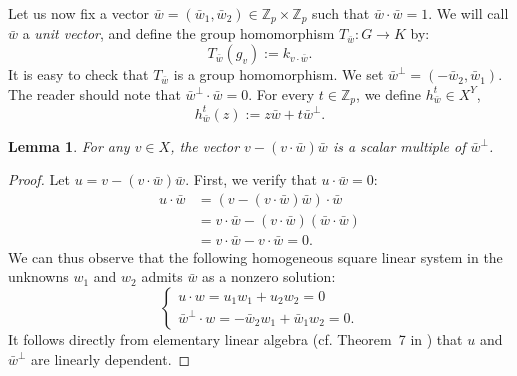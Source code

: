 \documentclass[11pt]{article}
\newtheorem{lemma}[theorem]{Lemma}
\newtheorem{proposition}[theorem]{Proposition}
\begin{document}
Let us now fix a vector $\bar{w} = (\bar{w}_1, \bar{w}_2) \in \mathbb{Z}_p \times \mathbb{Z}_p$ such that $\bar{w} \cdot \bar{w} = 1$. We will call $\bar w$ a \textit{unit vector}, and define the group homomorphism $T_{\bar w} \colon G \to K$ by:
\[
T_{\bar w}(g_v) := k_{v\cdot \bar w}.
\]
It is easy to check that $T_{\bar w}$ is a group homomorphism. We set $\bar{w}^\perp = (-\bar{w}_2, \bar{w}_1)$. The reader should note that $\bar{w}^\perp \cdot \bar w = 0$. For every $t \in \mathbb{Z}_p$, we define $h_{\bar{w}}^t \in X^Y$,
\begin{equation}
\label{eq:permutant}
    h_{\bar{w}}^t(z) := z\bar{w} + t\bar{w}^\perp.
\end{equation}

\begin{lemma}\label{lemma:multiple}
    For any $v \in X$, the vector $v - (v \cdot \bar{w})\bar{w}$ is a scalar multiple of $\bar{w}^\perp$.
\end{lemma}

\begin{proof}
    Let $u = v - (v \cdot \bar{w})\bar{w}$. 
    First, we verify that $u \cdot \bar{w} = 0$:
    \begin{align*}
        u \cdot \bar{w} &= (v - (v \cdot \bar{w})\bar{w}) \cdot \bar{w} \\
        &= v \cdot \bar{w} - (v \cdot \bar{w})(\bar{w} \cdot \bar{w}) \\
        &= v \cdot \bar{w} - v \cdot \bar{w} = 0.
    \end{align*}
  We can thus observe that the following homogeneous square linear system in the unknowns $w_1$ and $w_2$ admits $\bar w$ as a nonzero solution:
    \[
    \begin{cases}
        u \cdot w = u_1w_1 + u_2w_2 = 0 \\
        \bar{w}^\perp \cdot w = -\bar{w}_2w_1 + \bar{w}_1w_2 = 0.
    \end{cases}
    \]
It follows directly from elementary linear algebra (cf. Theorem~7 in \cite{hoffmann1971linear}) that $u$ and $\bar{w}^\perp$ are linearly dependent.
\end{proof}
\end{document}
